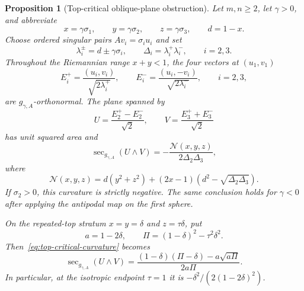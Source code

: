 \documentclass[11pt]{amsart}
\newtheorem{proposition}[theorem]{Proposition}
\theoremstyle{definition}
\theoremstyle{remark}
\DeclareMathOperator{\secop}{sec}
\begin{document}
\begin{proposition}[Top-critical oblique-plane obstruction]
\label{prop:top-critical-oblique}
Let $m,n\geq2$, let $\gamma>0$, and abbreviate
\[
 x=\gamma\sigma_1,\qquad y=\gamma\sigma_2,\qquad
 z=\gamma\sigma_3,\qquad d=1-x.
\]
Choose ordered singular pairs $Av_i=\sigma_i u_i$ and set
\[
 \lambda_i^\pm=d\pm\gamma\sigma_i,
 \qquad \Delta_i=\lambda_i^+\lambda_i^-,
 \qquad i=2,3.
\]
Throughout the Riemannian range $x+y<1$, the four vectors at
$(u_1,v_1)$
\[
 E_i^+=\frac{(u_i,v_i)}{\sqrt{2\lambda_i^+}},
 \qquad
 E_i^-=\frac{(u_i,-v_i)}{\sqrt{2\lambda_i^-}},
 \qquad i=2,3,
\]
are $g_{\gamma,A}$-orthonormal.  The plane spanned by
\begin{equation}\label{eq:top-critical-plane}
 U=\frac{E_2^+-E_2^-}{\sqrt2},
 \qquad
 V=\frac{E_3^++E_3^-}{\sqrt2}
\end{equation}
has unit squared area and
\begin{equation}\label{eq:top-critical-curvature}
 \secop_{g_{\gamma,A}}(U\wedge V)
 =-\frac{\mathcal N(x,y,z)}{2\Delta_2\Delta_3},
\end{equation}
where
\begin{equation}\label{eq:top-critical-numerator}
 \mathcal N(x,y,z)
 =d(y^2+z^2)+(2x-1)
   \left(d^2-\sqrt{\Delta_2\Delta_3}\right).
\end{equation}
If $\sigma_2>0$, this curvature is strictly negative.  The same
conclusion holds for $\gamma<0$ after applying the antipodal map on
the first sphere.

On the repeated-top stratum $x=y=\delta$ and $z=\tau\delta$, put
\[
 a=1-2\delta,
 \qquad \Pi=(1-\delta)^2-\tau^2\delta^2.
\]
Then~\eqref{eq:top-critical-curvature} becomes
\begin{equation}\label{eq:repeated-top-curvature}
 \secop_{g_{\gamma,A}}(U\wedge V)
 =\frac{(1-\delta)(\Pi-\delta)-a\sqrt{a\Pi}}
        {2a\Pi}.
\end{equation}
In particular, at the isotropic endpoint $\tau=1$ it is
$-\delta^2/(2(1-2\delta)^2)$.
\end{proposition}
\end{document}

